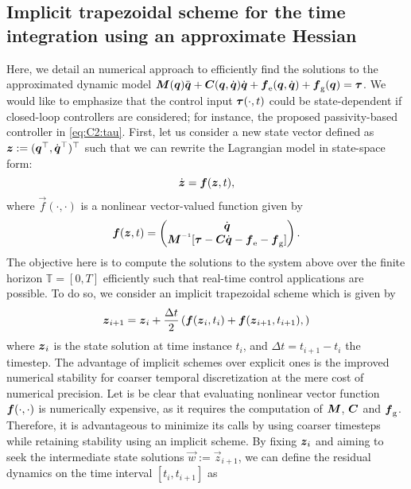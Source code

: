 \subsection{Implicit trapezoidal scheme for the time integration using an approximate Hessian}
\label{app:C2:timeint}
\noindent Here, we detail an numerical approach to efficiently find the solutions to the approximated dynamic model ${\boldsymbol{M}}({\boldsymbol{q}}){\ddot{\boldsymbol{q}}} + {\boldsymbol{C}}({\boldsymbol{q}},{\dot{\boldsymbol{q}}}){\dot{\boldsymbol{q}}} + {\boldsymbol{f}}_{\scriptstyle\textrm{e}}({\boldsymbol{q}},{\dot{\boldsymbol{q}}}) +  {\boldsymbol{f}}_{\scriptstyle\textrm{g}}({\boldsymbol{q}}) = \boldsymbol{\tau}$. We would like to emphasize that the control input $\boldsymbol{\tau}(\cdot,t)$ could be state-dependent if closed-loop controllers are considered; for instance, the proposed passivity-based controller in \eqref{eq:C2:tau}. First, let us consider a new state vector defined as $\boldsymbol{z} := ( {\boldsymbol{q}}^\top,{\dot{\boldsymbol{q}}}^\top )^\top$ such that we can rewrite the Lagrangian model in state-space form:
%
\begin{equation}
\dot{{\boldsymbol{z}}} = \boldsymbol{f}({\boldsymbol{z}},t),
\end{equation}
%
where $\vec{f}(\cdot,\cdot)$ is a nonlinear vector-valued function given by
%
\begin{equation}
\vec{f}(\zB,t) = \begin{pmatrix} \dq \\ \mat{M}\inv [\tauB - \CB\dq - \fB\elastic- \fB\grav] \end{pmatrix}.
\end{equation}
%
The objective here is to compute the solutions to the system above over the finite horizon $\mathbb{T} = [0,T]$ efficiently such that real-time control applications are possible. To do so, we consider an implicit trapezoidal scheme which is given by
%
\begin{equation}
{\boldsymbol{z}}_{i+1} = {\boldsymbol{z}}_{i} + \frac{\Delta t}{2} \left( {\boldsymbol{f}}({\boldsymbol{z}}_{i},t_{i}) + {\boldsymbol{f}}({\boldsymbol{z}}_{i+1},t_{i+1}),  \right)
\end{equation}
%
where ${\boldsymbol{z}}_{i}$ is the state solution at time instance $t_{i}$, and $\Delta t = t_{i+1} - t_{i}$ the timestep. The advantage of implicit schemes over explicit ones is the improved numerical stability for coarser temporal discretization at the mere cost of numerical precision. Let is be clear that evaluating nonlinear vector function ${\boldsymbol{f}}(\cdot,\cdot)$ is numerically expensive, as it requires the computation of $\boldsymbol{M}$, $\boldsymbol{C}$ and $\boldsymbol{{\boldsymbol{f}}}_{\scriptstyle\textrm{g}}$. Therefore, it is advantageous to minimize its calls by using coarser timesteps while retaining stability using an implicit scheme. By fixing ${\boldsymbol{z}}_{i}$ and aiming to seek the intermediate state solutions $\vec{w}:=\vec{z}_{i+1}$, we can define the residual dynamics on the time interval $[t_{i}, t_{i+1}]$ as
